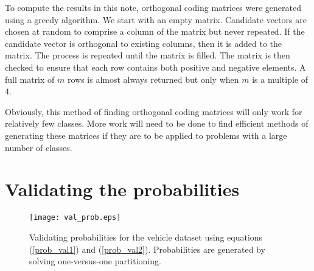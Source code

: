 To compute the results in this note, orthogonal coding matrices were generated
using a greedy algorithm.
We start with an empty matrix.
Candidate vectors are chosen at random to comprise a column of the matrix
but never repeated.
If the candidate vector is orthogonal to existing columns, then it is added to the matrix.
The process is repeated until the matrix is filled.
The matrix is then checked to ensure that each row contains both positive and
negative elements.
A full matrix of $m$ rows is almost always returned but only when $m$
is a multiple of $4$.

Obviously, this method of finding orthogonal coding matrices
will only work for relatively few classes.
More work will need to be done to find efficient methods
of generating these matrices
if they are to be applied to problems with a large number of classes.

\section{Validating the probabilities}

\begin{figure}
	\texttt{[image: val\_prob.eps]}
	\caption{Validating probabilities for the vehicle dataset
		using equations	(\ref{prob_val1}) and (\ref{prob_val2}).
		Probabilities are generated by solving one-versus-one 
		partitioning.}\label{val_prob}
\end{figure}

